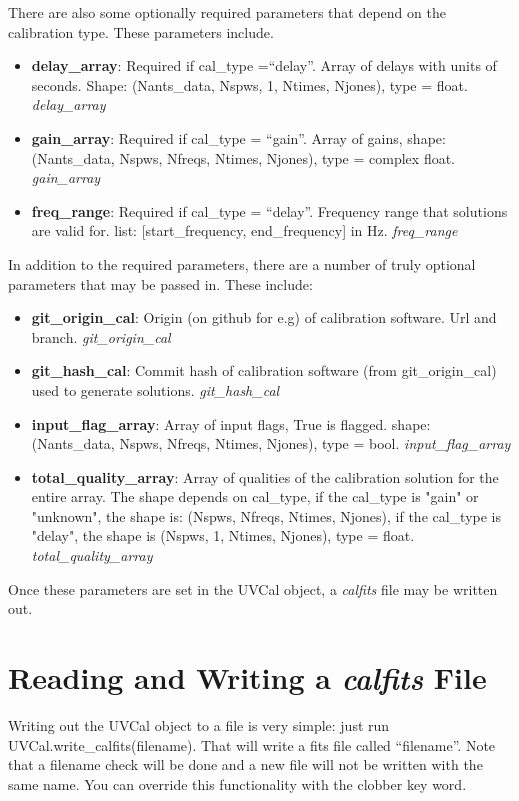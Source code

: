 \documentclass[11pt, oneside]{article}   	%
\begin{document}
There are also some optionally required parameters that depend on the
calibration type. These parameters include.
\begin{itemize}
\item{\textbf{delay\_array}: Required if cal\_type =``delay''. Array of delays with
    units of seconds. Shape: (Nants\_data, Nspws, 1, Ntimes, Njones), type = float. \emph{delay\_array}}
\item{\textbf{gain\_array}: Required if cal\_type = ``gain''. Array of gains, 
    shape: (Nants\_data, Nspws, Nfreqs, Ntimes, Njones), type = complex float. \emph{gain\_array}}
\item{\textbf{freq\_range}: Required if cal\_type = ``delay''. Frequency range that
   solutions are valid for. list: [start\_frequency, end\_frequency] in Hz. \emph{freq\_range}}
\end{itemize}

In addition to the required parameters, there are a number of truly optional
parameters that may be passed in. These include:

\begin{itemize}
\item{\textbf{git\_origin\_cal}: Origin (on github for e.g) of calibration
    software. Url and branch. \emph{git\_origin\_cal}}
\item{\textbf{git\_hash\_cal}: Commit hash of calibration software (from
    git\_origin\_cal) used to generate solutions. \emph{git\_hash\_cal}}
\item{\textbf{input\_flag\_array}: Array of input flags, True is flagged. shape:
    (Nants\_data, Nspws, Nfreqs, Ntimes, Njones), type = bool. \emph{input\_flag\_array}}
\item{\textbf{total\_quality\_array}: Array of qualities of the calibration
    solution for the entire array. The shape depends on cal\_type, if the cal\_type is
    "gain" or "unknown", the shape is: (Nspws, Nfreqs, Ntimes, Njones), if the 
    cal\_type is "delay", the shape is (Nspws, 1, Ntimes, Njones), type = float. \emph{total\_quality\_array}}
\end{itemize}

Once these parameters are set in the UVCal object, a \textit{calfits} file may
be written out.

\section{Reading and Writing a \textit{calfits} File}
Writing out the UVCal object to a file is very simple: just run
UVCal.write\_calfits(filename). That will write a fits file called
``filename''. Note that a filename check will be done and a new file will not be
written with the same name. You can override this functionality with the clobber
key word.
\end{document}
